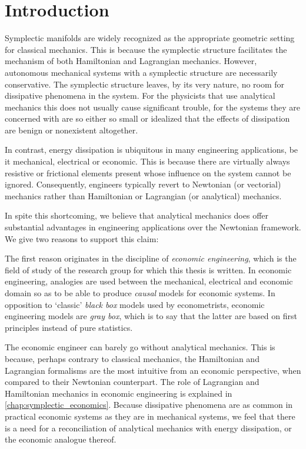 \chapter{Introduction}
\label{chap:intro}

Symplectic manifolds are widely recognized as the appropriate geometric setting for classical mechanics. This is because the symplectic structure facilitates the mechanism of both Hamiltonian and Lagrangian mechanics. However, autonomous mechanical systems with a symplectic structure are necessarily conservative. The symplectic structure leaves, by its very nature, no room for dissipative phenomena in the system. For the physicists that use analytical mechanics this does not usually cause significant trouble, for the systems they are concerned with are so either so small or idealized that the effects of dissipation are benign or nonexistent altogether.

In contrast, energy dissipation is ubiquitous in many engineering applications, be it mechanical, electrical or economic. This is because there are virtually always resistive or frictional elements present whose influence on the system cannot be ignored. Consequently, engineers typically revert to Newtonian (or vectorial) mechanics rather than Hamiltonian or Lagrangian (or analytical) mechanics.

In spite this shortcoming, we believe that analytical mechanics does offer substantial advantages in engineering applications over the Newtonian framework. We give two reasons to support this claim:

The first reason originates in the discipline of \emph{economic engineering}, which is the field of study of the research group for which this thesis is written. In economic engineering, analogies are used between the mechanical, electrical and economic domain so as to be able to produce \emph{causal} models for economic systems. In opposition to `classic' \emph{black box} models used by econometrists, economic engineering models are \emph{gray box}, which is to say that the latter are based on first principles instead of pure statistics. 

The economic engineer can barely go without analytical mechanics. This is because, perhaps contrary to classical mechanics, the Hamiltonian and Lagrangian formalisms are the most intuitive from an economic perspective, when compared to their Newtonian counterpart. The role of Lagrangian and Hamiltonian mechanics in economic engineering is explained in \cref{chap:symplectic_economics}. 
Because dissipative phenomena are as common in practical economic systems as they are in mechanical systems, we feel that there is a need for a reconciliation of analytical mechanics with energy dissipation, or the economic analogue thereof.

